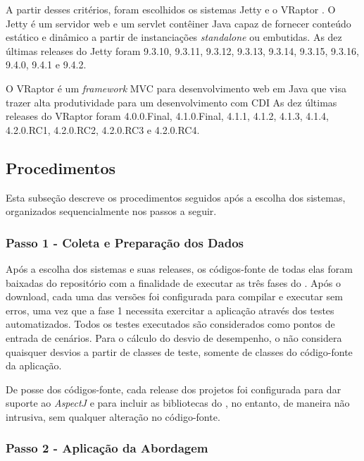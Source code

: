 A partir desses critérios, foram escolhidos os sistemas Jetty \cite{Jetty2016} e o VRaptor \cite{VRaptor2017}. O Jetty é um servidor web e um servlet contêiner Java capaz de fornecer conteúdo estático e dinâmico a partir de instanciações \textit{standalone} ou embutidas. As dez últimas releases do Jetty foram 9.3.10, 9.3.11, 9.3.12, 9.3.13, 9.3.14, 9.3.15, 9.3.16, 9.4.0, 9.4.1 e 9.4.2.

O VRaptor é um \textit{framework} MVC para desenvolvimento web em Java que visa trazer alta produtividade para um desenvolvimento com CDI  As dez últimas releases do VRaptor foram 4.0.0.Final, 4.1.0.Final, 4.1.1, 4.1.2, 4.1.3, 4.1.4, 4.2.0.RC1, 4.2.0.RC2, 4.2.0.RC3 e 4.2.0.RC4.

\subsection{Procedimentos} \label{subsec:avaliacao-procedimentos}

Esta subseção descreve os procedimentos seguidos após a escolha dos sistemas, organizados sequencialmente nos passos a seguir.

\subsubsection{Passo 1 - Coleta e Preparação dos Dados} \label{subsec:avaliacao-procedimentos-passo-1}

Após a escolha dos sistemas e suas releases, os códigos-fonte de todas elas foram baixadas do repositório com a finalidade de executar as três fases do \textit{\perfMinerName}. Após o download, cada uma das versões foi configurada para compilar e executar sem erros, uma vez que a fase 1 necessita exercitar a aplicação através dos testes automatizados. Todos os testes executados são considerados como pontos de entrada de cenários. Para o cálculo do desvio de desempenho, o \textit{\perfMinerName} não considera quaisquer desvios a partir de classes de teste, somente de classes do código-fonte da aplicação.

De posse dos códigos-fonte, cada release dos projetos foi configurada para dar suporte ao \textit{AspectJ} e para incluir as bibliotecas do \textit{\perfMinerName}, no entanto, de maneira não intrusiva, sem qualquer alteração no código-fonte.

\subsubsection{Passo 2 - Aplicação da Abordagem} \label{subsec:avaliacao-procedimentos-passo-2}

